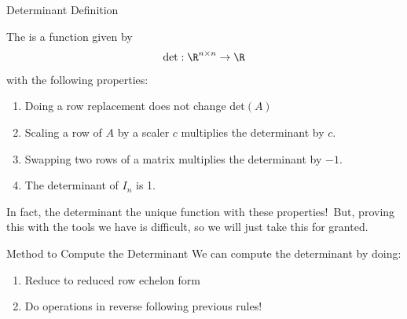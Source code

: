 \documentclass[xcoler=dvipsnames, aspectratio=169]{beamer}
\date{Determinants}
\begin{document}
    \begin{frame}{Determinant Definition}
        \small
        \begin{defn}
            The  is a function given by
            \[
                \textnormal{det}:\R^{n\times n}\rightarrow\R
            \]
            with the following properties:
            \begin{enumerate}
                \pause\item Doing a row replacement does not change det$(A)$
                \pause\item Scaling a row of $A$ by a scaler $c$ multiplies the determinant by $c$.
                \pause\item Swapping two rows of a matrix multiplies the determinant by $-1$.
                \pause\item The determinant of $I_n$ is 1.
            \end{enumerate}
        \end{defn}
        \pause
        \begin{tcolorbox}
            In fact, the determinant the unique function with these properties!\pause\
            But, proving this with the tools we have is difficult, so we will just take this for granted.
        \end{tcolorbox}
    \end{frame}
    \begin{frame}{Method to Compute the Determinant}
        We can compute the determinant by doing:
        \begin{enumerate}
            \pause\item Reduce to reduced row echelon form
            \pause\item Do operations in reverse following previous rules!
        \end{enumerate}
    \end{frame}
\end{document}
